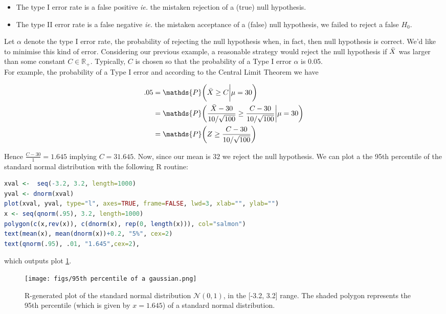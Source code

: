 \documentclass{homework}
\begin{document}
\begin{itemize}
    \item The type I error rate is a false positive \textit{ie.} the mistaken rejection of a (true) null hypothesis. 
    \item The type II error rate is a false negative \textit{ie.} the mistaken acceptance of a (false) null hypothesis, we failed to reject a false $H_0$.
\end{itemize}

Let $\alpha$ denote the type I error rate, the probability of rejecting the null hypothesis when, in fact, then null hypothesis is correct. We'd like to minimise this kind of error. Considering our previous example, a reasonable strategy would reject the null hypothesis if $\Bar{X}$ was larger than some constant $C \in \mathds{R}_{+}$. Typically, $C$ is chosen so that the probability of a Type I error $\alpha$ is 0.05. \\

For example, the probability of a Type I error and according to the Central Limit Theorem we have  

\begin{align*}
        .05 &= \mathds{P}\bigg(\Bar{X}\geq C \bigg| \mu = 30 \bigg) \\
        &=\mathds{P}\bigg(\frac{\Bar{X}-30}{10/\sqrt{100}}\geq \frac{C-30}{10/\sqrt{100}} \bigg| \mu = 30 \bigg) \\
        &= \mathds{P}\bigg(Z\geq \frac{C-30}{10/\sqrt{100}}\bigg)
\end{align*}

Hence $\frac{C-30}{1}=1.645$ implying $C=31.645$. Now, since our mean is $32$ we reject the null hypothesis. We can plot a the 95th percentile of the standard normal distribution with the following R routine:

\clearpage

\begin{lstlisting}[language=R]
xval <-  seq(-3.2, 3.2, length=1000)
yval <- dnorm(xval)
plot(xval, yval, type="l", axes=TRUE, frame=FALSE, lwd=3, xlab="", ylab="")
x <- seq(qnorm(.95), 3.2, length=1000)
polygon(c(x,rev(x)), c(dnorm(x), rep(0, length(x))), col="salmon")
text(mean(x), mean(dnorm(x))+0.2, "5%", cex=2)
text(qnorm(.95), .01, "1.645",cex=2),
\end{lstlisting} 

which outputs plot \ref{fig: normal Z test}. 

\begin{figure}
    \centering
    \texttt{[image: figs/95th percentile of a gaussian.png]} 
    \caption{R-generated plot of the standard normal distribution $\mathcal{N}(0,1)$,  in the [-3.2, 3.2] range. The shaded polygon represents the 95th percentile (which is given by $x=1.645$) of a standard normal distribution. }
    \label{fig: normal Z test}
\end{figure}
\end{document}
